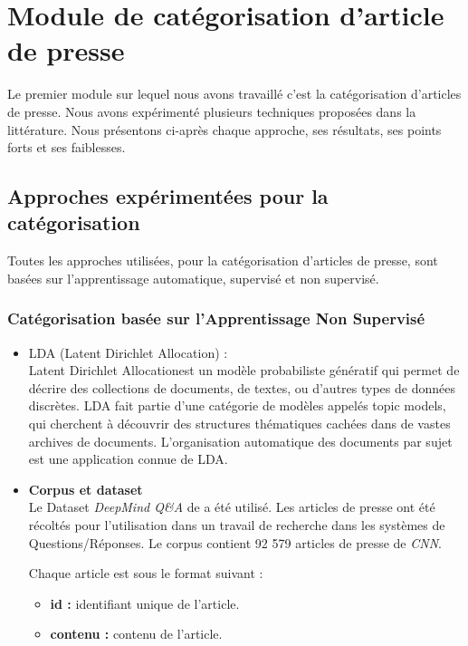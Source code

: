 \section{Module de catégorisation d'article de presse}
Le premier module sur lequel nous avons travaillé c'est la catégorisation d'articles de presse. Nous avons expérimenté plusieurs techniques proposées dans la littérature. Nous présentons ci-après chaque approche, ses résultats, ses points forts et ses faiblesses.

    \subsection{Approches expérimentées pour la catégorisation\label{approches}}
    Toutes les approches utilisées, pour la catégorisation d'articles de presse, sont basées sur l'apprentissage automatique, supervisé et non supervisé. 

    \subsubsection{Catégorisation basée sur l'Apprentissage Non Supervisé}\label{non-supervised}
        \begin{itemize}
            \item{LDA (Latent Dirichlet Allocation) : }\\
            \textquotedbl Latent Dirichlet Allocation\textquotedbl  est un modèle probabiliste génératif qui permet de décrire des collections de documents, de textes, ou d'autres types de données discrètes. LDA fait partie d'une catégorie de modèles appelés \textquotedbl topic models\textquotedbl , qui cherchent à découvrir des structures thématiques cachées dans de vastes archives de documents. L'organisation automatique des documents par sujet est une application connue de LDA.
        \end{itemize}
        
    \begin{itemize}[label={}, leftmargin=*]
        \item{\textbf{Corpus et dataset}}\\
        Le Dataset \emph{DeepMind Q\&A} de \cite{cnndailymail} a été utilisé. Les articles de presse ont été récoltés pour l'utilisation dans un travail de recherche dans les systèmes de Questions/Réponses. Le corpus contient 92 579 articles de presse de \emph{CNN}.

        Chaque article est sous le format suivant :
       \begin{itemize}
        \item \textbf{id : }identifiant unique de l'article.
        \item \textbf{contenu : }contenu de l'article.
       \end{itemize}
    \end{itemize}
        
